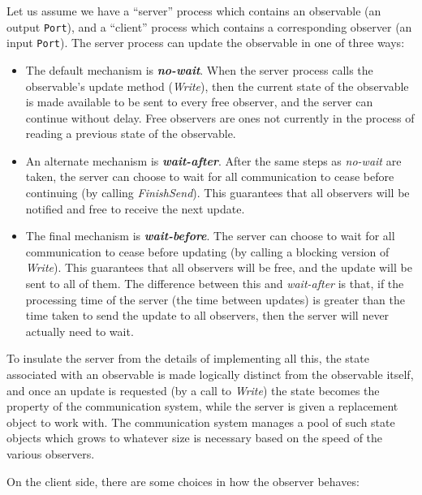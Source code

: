 Let us assume we have a ``server'' process which contains an
observable (an output {\tt Port}), and a ``client'' process
which contains a corresponding observer (an input {\tt Port}).
The server process can update the observable in one of three ways:

\begin{itemize} \pflist

\item The default mechanism is \textbf{\textit{no-wait}}.  When the
server process calls the observable's update method ({\it Write}),
then the current state of the observable is made available to be sent
to every free observer, and the server can continue without delay.
Free observers are ones not currently in the process of reading a
previous state of the observable.

\item An alternate mechanism is \textbf{\textit{wait-after}}.  After the same 
steps as {\it no-wait} are taken, the server can choose
to wait for all communication to cease before continuing (by 
calling {\it FinishSend}).  This guarantees that all observers will
be notified and free to receive the next update.

\item The final mechanism is \textbf{\textit{wait-before}}.  The server can choose
to wait for all communication to cease before updating (by calling a
blocking version of {\it Write}).  This guarantees that all observers
will be free, and the update will be sent to all of them.  The
difference between this and {\it wait-after} is that, if the processing
time of the server (the time between updates) is greater than the time 
taken to send the update to all observers, then the server will never
actually need to wait.

\end{itemize}

\noindent
%
To insulate the server from the details of implementing all this, the
state associated with an observable is made logically distinct from
the observable itself, and once an update is requested (by a call to
{\em Write}) the state becomes the property of the communication
system, while the server is given a replacement object to work with.
%
The communication system manages a pool of such state objects which
grows to whatever size is necessary based on the speed of the various
observers.
%

On the client side, there are some choices in how the
observer behaves:

